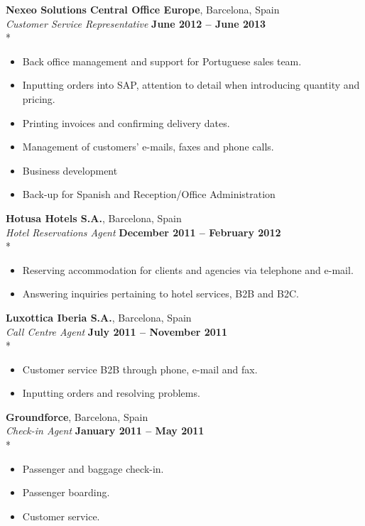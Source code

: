 \documentclass[margin,line]{resume}
\begin{document}
\begin{resume}
    \textbf{Nexeo Solutions Central Office Europe}, Barcelona, Spain \vspace{2mm}\\\vspace{1mm}%
    \textsl{Customer Service Representative} \hfill \textbf{June 2012 -- June 2013}\\*
    \begin{itemize}
    \item Back office management and support for Portuguese sales team.
    \item Inputting orders into SAP, attention to detail when introducing quantity and pricing.
    \item Printing invoices and confirming delivery dates. 
    \item Management of customers' e-mails, faxes and phone calls.
    \item Business development 
    \item Back-up for Spanish and Reception/Office Administration
    \end{itemize}
    
    \textbf{Hotusa Hotels S.A.}, Barcelona, Spain \vspace{2mm}\\\vspace{1mm}%
    \textsl{Hotel Reservations Agent} \hfill \textbf{December 2011 -- February 2012}\\*
    \begin{itemize}
    \item Reserving accommodation for clients and agencies via telephone and e-mail. 
    \item Answering inquiries pertaining to hotel services, B2B and B2C. 
    \end{itemize}
    \clearpage
    
    \textbf{Luxottica Iberia S.A.}, Barcelona, Spain \vspace{2mm}\\\vspace{1mm}%
    \textsl{Call Centre Agent} \hfill \textbf{July 2011 -- November 2011}\\*
    \begin{itemize}
    \item Customer service B2B through phone, e-mail and fax. 
    \item Inputting orders and resolving problems. 
    \end{itemize}
    
    \textbf{Groundforce}, Barcelona, Spain \vspace{2mm}\\\vspace{1mm}%
    \textsl{Check-in Agent} \hfill \textbf{January 2011 -- May 2011}\\*
    \begin{itemize}
    \item Passenger and baggage check-in. 
    \item Passenger boarding. 
    \item Customer service. 
    \end{itemize}
    

\end{resume}
\end{document}
